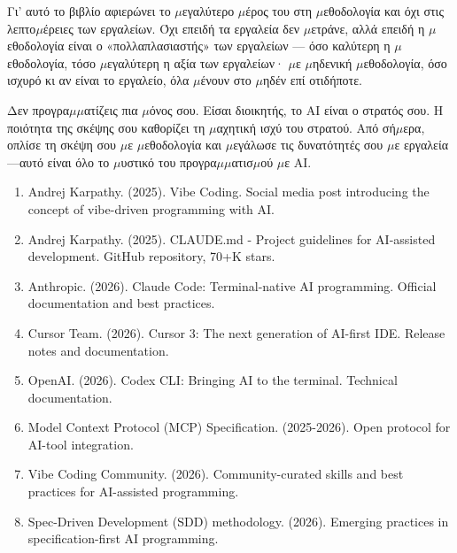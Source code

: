 Γι' αυτό το βιβλίο αφιερώνει το $\mu$εγαλύτερο $\mu$έρος του στη $\mu$εθοδολογία και όχι στις λεπτο$\mu$έρειες των εργαλείων. Όχι επειδή τα εργαλεία δεν $\mu$ετράνε, αλλά επειδή η $\mu$εθοδολογία είναι ο «πολλαπλασιαστής» των εργαλείων — όσο καλύτερη η $\mu$εθοδολογία, τόσο $\mu$εγαλύτερη η αξία των εργαλείων· $\mu$ε $\mu$ηδενική $\mu$εθοδολογία, όσο ισχυρό κι αν είναι το εργαλείο, όλα $\mu$ένουν στο $\mu$ηδέν επί οτιδήποτε.

Δεν προγρα$\mu$$\mu$ατίζεις πια $\mu$όνος σου. Είσαι διοικητής, το AI είναι ο στρατός σου. Η ποιότητα της σκέψης σου καθορίζει τη $\mu$αχητική ισχύ του στρατού. Από σή$\mu$ερα, οπλίσε τη σκέψη σου $\mu$ε $\mu$εθοδολογία και $\mu$εγάλωσε τις δυνατότητές σου $\mu$ε εργαλεία—αυτό είναι όλο το $\mu$υστικό του προγρα$\mu$$\mu$ατισ$\mu$ού $\mu$ε AI.


\begin{enumerate}
  \item Andrej Karpathy. (2025). Vibe Coding. Social media post introducing the concept of vibe-driven programming with AI.
  \item Andrej Karpathy. (2025). CLAUDE.md - Project guidelines for AI-assisted development. GitHub repository, 70+K stars.
  \item Anthropic. (2026). Claude Code: Terminal-native AI programming. Official documentation and best practices.
  \item Cursor Team. (2026). Cursor 3: The next generation of AI-first IDE. Release notes and documentation.
  \item OpenAI. (2026). Codex CLI: Bringing AI to the terminal. Technical documentation.
  \item Model Context Protocol (MCP) Specification. (2025-2026). Open protocol for AI-tool integration.
  \item Vibe Coding Community. (2026). Community-curated skills and best practices for AI-assisted programming.
  \item Spec-Driven Development (SDD) methodology. (2026). Emerging practices in specification-first AI programming.
\end{enumerate}
